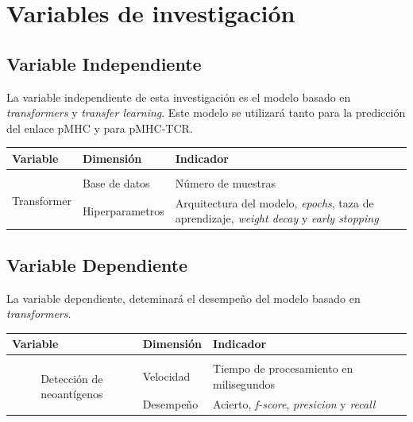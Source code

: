 \documentclass[a4paper]{article}
\begin{document}
\section{Variables de investigación}


\subsection{Variable Independiente}

La variable independiente de esta investigación es el modelo basado en \textit{transformers} y \textit{transfer learning}. Este modelo se utilizará tanto para la predicción del enlace pMHC y para pMHC-TCR.

\begin{table}[H]
	\centering
	\setlength{\tabcolsep}{0.5em} %
	{\renewcommand{\arraystretch}{1.2}%
	\begin{tabular}{clp{8cm}}
		\multicolumn{1}{l}{\textbf{Variable}}      & \textbf{Dimensión} & \textbf{Indicador}   \\ \hline                   \\
		\multirow{2}{*}{Transformer} & Base de datos          & Número de muestras \\
		& Hiperparametros          & Arquitectura del modelo, \textit{epochs}, taza de aprendizaje,  \textit{weight decay}  y \textit{early stopping}
	\end{tabular}
}
\end{table}


\subsection{Variable Dependiente}

La variable dependiente, deteminará el desempeño del modelo basado en \textit{transformers}.

\begin{table}[H]
	\centering
	\setlength{\tabcolsep}{0.5em} %
	{\renewcommand{\arraystretch}{1.2}%
	\begin{tabular}{clp{8cm}}
		\multicolumn{1}{l}{\textbf{Variable}}      & \textbf{Dimensión} & \textbf{Indicador}   \\ \hline                   \\
		\multirow{2}{*}{Detección de neoantígenos} & Velocidad          & Tiempo de procesamiento en milisegundos \\
		& Desempeño          & Acierto, \textit{f-score}, \textit{presicion} y \textit{recall}   
	\end{tabular}
}
\end{table}
\end{document}
